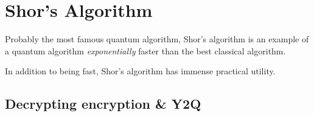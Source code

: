 \chapter{Shor's Algorithm}

Probably the most famous quantum algorithm, Shor's algorithm is an example of a quantum algorithm \textit{exponentially} faster than the best classical algorithm. 

In addition to being fast, Shor's algorithm has immense practical utility. 

\section{Decrypting encryption \& Y2Q}
